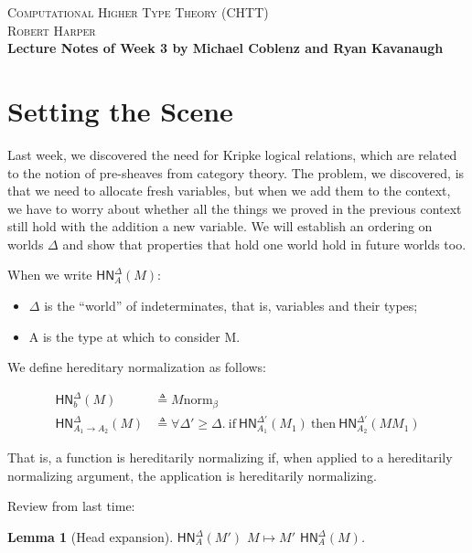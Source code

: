 \documentclass{article}
\newtheorem{lem}[thm]{Lemma}
\newcommand{\bnorm}[1]{\ensuremath{#1 \mathrel{\text{norm}_\beta}}}
\newcommand{\hnorm}[3]{\ensuremath{\mathsf{HN}^{#1}_{#2}(#3)}}
\newcommand{\step}[2]{\ensuremath{#1 \mapsto #2}}
\newcommand{\fn}[2]{\ensuremath{#1 \to #2}}
\begin{document}
\begin{center}
\Large{\scshape Computational Higher Type Theory (CHTT)}\\[2pt]
\large{\scshape Robert Harper}\\[4pt]
\large\bfseries{Lecture Notes of Week 3 by Michael Coblenz and Ryan Kavanaugh}
\end{center}

\bigskip

\section{Setting the Scene}
Last week, we discovered the need for Kripke logical relations, which are related to the notion of pre-sheaves from category theory. The problem, we discovered, is that we need to allocate fresh variables, but when we add them to the context, we have to worry about whether all the things we proved in the previous context still hold with the addition a new variable. We will establish an ordering on worlds $\Delta$ and show that properties that hold one world hold in future worlds too.

When we write \hnorm{\Delta}{A}{M}: 
\begin{itemize}
\item $\Delta$ is the ``world'' of indeterminates, that is, variables and their types;
\item A is the type at which to consider M.
\end{itemize}


We define hereditary normalization as follows:

\begin{align*}
\hnorm{\Delta}{b}{M} &\triangleq \bnorm{M} \\
\hnorm{\Delta}{\fn{A_1}{A_2}}{M} &\triangleq  \forall \Delta' \geq \Delta. \  \text{if} \ \hnorm{\Delta'}{A_1}{M_1}\  \text{then} \ \hnorm{\Delta'}{A_2}{M M_1}
\end{align*}


That is, a function is hereditarily normalizing if, when applied to a hereditarily normalizing argument, the application is hereditarily normalizing.

Review from last time:
\begin{lem}[Head expansion]\label{lem:hexp}
   $\hnorm{\Delta}{A}{M'}$  $\step{M}{M'}$  $\hnorm{\Delta}{A}{M}$.
\end{lem}
\end{document}
